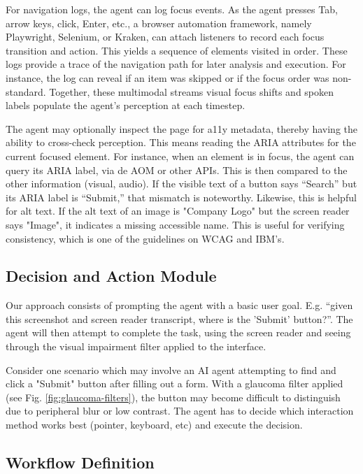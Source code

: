 For navigation logs, the agent can log focus events. As the agent presses Tab, arrow keys, click, Enter, etc., a browser automation framework, namely Playwright\cite{playwright2025}, Selenium\cite{garcia2024selenium}, or Kraken\cite{ravelo2023kraken}, can attach listeners to record each focus transition and action. This yields a sequence of elements visited in order\cite{ravelo2023kraken}. 
These logs provide a trace of the navigation path for later analysis and execution. For instance, the log can reveal if an item was skipped or if the focus order was non-standard. Together, these multimodal streams visual focus shifts and spoken labels populate the agent's perception at each timestep. 

The agent may optionally inspect the page for \ac{a11y} metadata, thereby having the ability to cross-check perception. This means reading the ARIA attributes for the current focused element. For instance, when an element is in focus, the agent can query its ARIA label, via de \ac{AOM} or other APIs. This is then compared to the other information (visual, audio). If the visible text of a button says “Search” but its ARIA label is “Submit,” that mismatch is noteworthy. Likewise, this is helpful for alt text. If the alt text of an image is "Company Logo" but the screen reader says "Image", it indicates a missing accessible name. This is useful for verifying consistency, which is one of the guidelines on \ac{WCAG} and IBM's\cite{ibm2025accessibility}. 

\subsection{Decision and Action Module}

Our approach consists of prompting the agent with a basic user goal. E.g. “given this screenshot and screen reader transcript, where is the 'Submit' button?”. The agent will then attempt to complete the task, using the screen reader and seeing through the visual impairment filter applied to the interface.

Consider one scenario which may involve an \ac{AI} agent attempting to find and click a "Submit" button after filling out a form. With a glaucoma filter applied (see Fig. \ref{fig:glaucoma-filters}), the button may become difficult to distinguish due to peripheral blur or low contrast. The agent has to decide which interaction method works best (pointer, keyboard, etc) and execute the decision.

\subsection{Workflow Definition}

